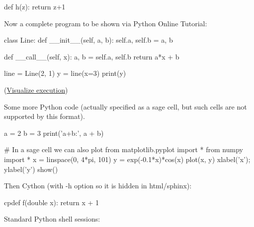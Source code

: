 \documentclass[%
oneside,                 %
final,                   %
10pt]{article}
\theoremstyle{definition}
\begin{document}
\bpycod
def h(z):
    return z+1

\epycod


Now a complete program to be shown via Python Online Tutorial:













\bpypro
class Line:
    def __init__(self, a, b):
        self.a, self.b = a, b

    def __call__(self, x):
        a, b = self.a, self.b
        return a*x + b

line = Line(2, 1)
y = line(x=3)
print(y)

\epypro

\noindent
(\href{{https://pythontutor.com/visualize.html\#code=class+Line\%3A\%0A++++def+__init__\%28self\%2C+a\%2C+b\%29\%3A\%0A++++++++self.a\%2C+self.b+\%3D+a\%2C+b\%0A\%0A++++def+__call__\%28self\%2C+x\%29\%3A\%0A++++++++a\%2C+b+\%3D+self.a\%2C+self.b\%0A++++++++return+a\%2Ax+\%2B+b\%0A\%0Aline+\%3D+Line\%282\%2C+1\%29\%0Ay+\%3D+line\%28x\%3D3\%29\%0Aprint\%28y\%29&mode=display&cumulative=false&heapPrimitives=false&drawParentPointers=false&textReferences=false&py=2&curInstr=0}}{Visualize execution}) 


Some more Python code (actually specified as a sage cell, but
such cells are not supported by this format).














\bpypro
a = 2
b = 3
print('a+b:', a + b)

# In a sage cell we can also plot
from matplotlib.pyplot import *
from numpy import *
x = linspace(0, 4*pi, 101)
y = exp(-0.1*x)*cos(x)
plot(x, y)
xlabel('x'); ylabel('y')
show()

\epypro


Then Cython (with -h option so it is hidden in html/sphinx):




\bcycod
cpdef f(double x):
    return x + 1

\ecycod


Standard Python shell sessions:
\end{document}
